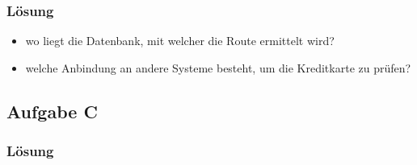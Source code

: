 \documentclass[11pt]{article}
\begin{document}
\subsubsection{Lösung}
\label{sec-2-2-1}

\begin{itemize}
\item wo liegt die Datenbank, mit welcher die Route ermittelt wird?
\item welche Anbindung an andere Systeme besteht, um die Kreditkarte
      zu prüfen?
\end{itemize}
\subsection{Aufgabe C}
\label{sec-2-3}
\subsubsection{Lösung}
\label{sec-2-3-1}
\end{document}
